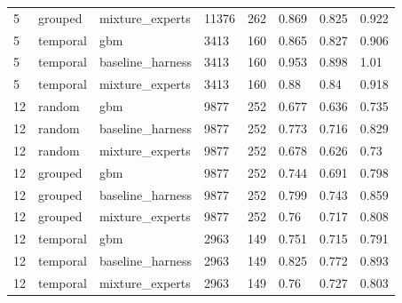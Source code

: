 \begin{tabular}{llllllll}
5 & grouped & mixture\_experts & 11376 & 262 & 0.869 & 0.825 & 0.922 \\
5 & temporal & gbm & 3413 & 160 & 0.865 & 0.827 & 0.906 \\
5 & temporal & baseline\_harness & 3413 & 160 & 0.953 & 0.898 & 1.01 \\
5 & temporal & mixture\_experts & 3413 & 160 & 0.88 & 0.84 & 0.918 \\
12 & random & gbm & 9877 & 252 & 0.677 & 0.636 & 0.735 \\
12 & random & baseline\_harness & 9877 & 252 & 0.773 & 0.716 & 0.829 \\
12 & random & mixture\_experts & 9877 & 252 & 0.678 & 0.626 & 0.73 \\
12 & grouped & gbm & 9877 & 252 & 0.744 & 0.691 & 0.798 \\
12 & grouped & baseline\_harness & 9877 & 252 & 0.799 & 0.743 & 0.859 \\
12 & grouped & mixture\_experts & 9877 & 252 & 0.76 & 0.717 & 0.808 \\
12 & temporal & gbm & 2963 & 149 & 0.751 & 0.715 & 0.791 \\
12 & temporal & baseline\_harness & 2963 & 149 & 0.825 & 0.772 & 0.893 \\
12 & temporal & mixture\_experts & 2963 & 149 & 0.76 & 0.727 & 0.803 \\
\bottomrule
\end{tabular}